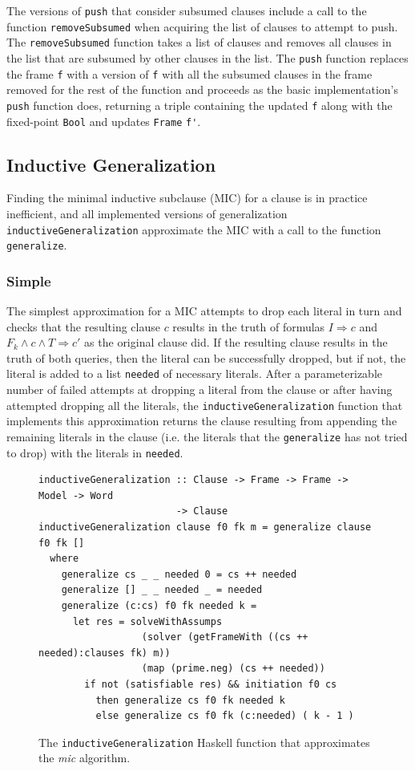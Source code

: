 \documentclass[12pt,a4paper,twoside,openright]{report}
\begin{document}
{The versions of \verb,push, that consider subsumed clauses include a call to the function
\verb,removeSubsumed, when acquiring the list of clauses to attempt to push.
The \verb,removeSubsumed, function takes a list of clauses and removes all clauses in the list
that are subsumed by other clauses in the list. The \verb,push, function replaces the frame
\verb,f, with a version of \verb,f, with all the subsumed clauses in the frame removed for
the rest of the function and proceeds as the basic implementation's \verb,push, function does,
returning a triple containing the updated \verb,f, along with the fixed-point \verb,Bool,
and updates \verb,Frame, \verb,f',.

\subsection{Inductive Generalization}
Finding the minimal inductive subclause (MIC) for a clause is in practice inefficient,
and all implemented versions of generalization
\verb,inductiveGeneralization, approximate the MIC with a call to the function
\verb,generalize,.

\subsubsection{Simple}
The simplest approximation for a MIC attempts to drop each literal in turn and checks
that the resulting clause $c$ results in the truth of formulas $I \Rightarrow c$ and
$F_k \wedge c \wedge T \Rightarrow c'$ as the original clause did. If the resulting clause
results in the truth of both queries, then the literal can be successfully dropped,
but if not, the literal is added to a list \verb,needed, of necessary literals.
After a parameterizable number of failed attempts at dropping a literal from the clause or after
having attempted dropping all the literals, the
\verb,inductiveGeneralization, function that implements this approximation
returns the clause resulting from appending the remaining
literals in the clause (i.e. the literals that the \verb,generalize, has not tried to drop)
with the literals in \verb,needed,.

\begin{figure}[!Ht]
\centering
\begin{lstlisting}
inductiveGeneralization :: Clause -> Frame -> Frame -> Model -> Word
                        -> Clause
inductiveGeneralization clause f0 fk m = generalize clause f0 fk []
  where
    generalize cs _ _ needed 0 = cs ++ needed
    generalize [] _ _ needed _ = needed
    generalize (c:cs) f0 fk needed k = 
      let res = solveWithAssumps
                  (solver (getFrameWith ((cs ++ needed):clauses fk) m))
                  (map (prime.neg) (cs ++ needed))
        if not (satisfiable res) && initiation f0 cs
          then generalize cs f0 fk needed k
          else generalize cs f0 fk (c:needed) ( k - 1 ) 
\end{lstlisting}
\caption{The {\tt inductiveGeneralization} Haskell function that approximates the {\it mic} algorithm.}
\end{figure}

}
\end{document}
